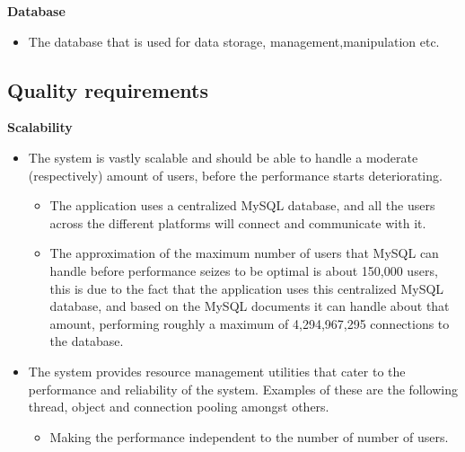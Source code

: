 \documentclass[10pt,a4paper]{article}
\begin{document}
\begin{center}\textbf{Database}\end{center}
	  \begin{itemize}
                                                \item The database that is used for data storage, management,manipulation etc.
                                \end{itemize}                                                                                                
	
\subsection{Quality requirements}
\begin{center}\textbf{Scalability}\end{center}
                               \begin{itemize}
                                                \item The system is vastly scalable and should be able to handle a moderate (respectively) amount of users, before the performance starts deteriorating.
                                                \begin{itemize}
                                                                \item The application uses a centralized MySQL database, and all the users across the different platforms will connect and communicate with it. 
                                                                \item The approximation of the maximum number of users that MySQL can handle before performance seizes to be optimal is about 150,000 users, this is due to the fact that the application uses this centralized MySQL database, and based on the MySQL documents it can handle about that amount, performing roughly a maximum of 4,294,967,295 connections to the database. 
                                                \end{itemize}
                                \end{itemize}
                \begin{itemize}
                        \item The system provides resource management utilities that cater to the performance and reliability of the system. Examples of these are the following thread, object and connection pooling amongst others.
                        \begin{itemize}
                                \item Making the performance independent to the number of number of users.
                        \end{itemize}
                \end{itemize}
\end{document}
